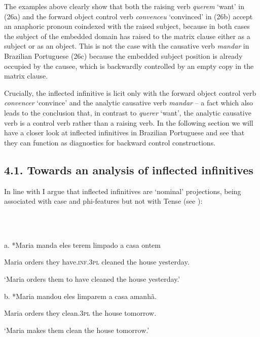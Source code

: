 \documentclass[output=paper]{langsci/langscibook}
\begin{document}
The examples above clearly show that both the raising verb \textit{querem} ‘want’ in (26a) and the forward object control verb \textit{convenceu} ‘convinced’ in (26b) accept an anaphoric pronoun coindexed with the raised subject, because in both cases the subject of the embedded domain has raised to the matrix clause either as a subject or as an object. This is not the case with the causative verb \textit{mandar} in Brazilian Portuguese (26c) because the embedded subject position is already occupied by the causee, which is backwardly controlled by an empty copy in the matrix clause. 

Crucially, the inflected infinitive is licit only with the forward object control verb \textit{convencer} ‘convince’ and the analytic causative verb \textit{mandar} – a fact which also leads to the conclusion that, in contrast to \textit{querer} ‘want’, the analytic causative verb is a control verb rather than a raising verb. In the following section we will have a closer look at inflected infinitives in Brazilian Portuguese and see that they can function as diagnostics for backward control constructions.

\subsection{ 4.1. Towards an analysis of inflected infinitives}

In line with \citet{Raposo1987} I argue that inflected infinitives are ‘nominal’ projections, being associated with case and phi-features but not with Tense (see \citealt{Stowell1982}):

\ea%
    \label{ex:moreno:27}
    \gll\\
        \\
    \glt
    \z

          a.  *Maria manda   eles   terem        limpado a casa        ontem

    Maria  orders     they have.\textsc{inf.3pl} cleaned the house   yesterday.

    ‘Maria orders them to have cleaned the house yesterday.’

  b.  *Maria mandou eles limparem  a casa     amanhã.

    Maria   orders    they clean.\textsc{3pl} the house   tomorrow.

    ‘Maria makes them clean the house tomorrow.’
\end{document}
